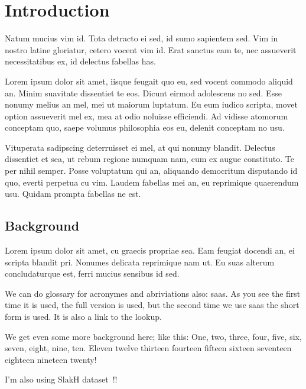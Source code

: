 \chapter{Introduction}

Natum mucius vim id. Tota detracto ei sed, id sumo sapientem sed. Vim in nostro latine gloriatur, cetero vocent vim id. Erat sanctus eam te, nec assueverit necessitatibus ex, id delectus fabellas has.

Lorem ipsum dolor sit amet, iisque feugait quo eu, sed vocent commodo aliquid an. Minim suavitate dissentiet te eos. Dicunt eirmod adolescens no sed. Esse nonumy melius an mel, mei ut maiorum luptatum. Eu eum iudico scripta, movet option assueverit mel ex, mea at odio noluisse efficiendi. Ad vidisse atomorum conceptam quo, saepe volumus philosophia eos eu, delenit conceptam no usu.

Vituperata sadipscing deterruisset ei mel, at qui nonumy blandit. Delectus dissentiet et sea, ut rebum regione numquam nam, cum ex augue constituto. Te per nihil semper. Posse voluptatum qui an, aliquando democritum disputando id quo, everti perpetua cu vim. Laudem fabellas mei an, eu reprimique quaerendum usu. Quidam prompta fabellas ne est.

\section{Background}

Lorem ipsum dolor sit amet, cu graecis propriae sea. Eam feugiat docendi an, ei scripta blandit pri. Nonumes delicata reprimique nam ut. Eu suas alterum concludaturque est, ferri mucius sensibus id sed.

We can do glossary for acronymes and abriviations also: \gls{saas}. As you see the first time it is used, the full version is used, but the second time we use \gls{saas} the short form is used. It is also a link to the lookup.

We get even some more background here; like this: One, two, three, four, five, six, seven, eight, nine, ten.
Eleven twelve thirteen fourteen fifteen sixteen seventeen eighteen nineteen twenty!

I'm also using SlakH dataset~\cite{manilow2019cutting}!!